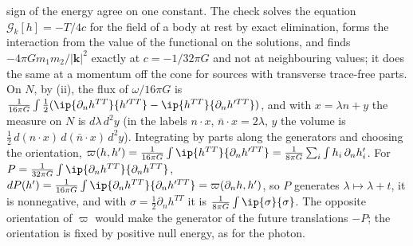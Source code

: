 sign of the energy agree on one constant. The check solves the equation $\mathcal{G}_{k}[h] = -T/4c$ for the field of a body at rest by exact elimination, forms the interaction from the value of the functional on the solutions, and finds $-4\pi G m_{1}m_{2}/|\mathbf{k}|^{2}$ exactly at $c = -1/32\pi G$ and not at neighbouring values; it does the same at a momentum off the cone for sources with transverse trace-free parts. On $N$, by (ii), the flux of $\omega/16\pi G$ is $\tfrac{1}{16\pi G}\int\tfrac12(\ip{\partial_{n}h^{TT}}{h'^{TT}} - \ip{h^{TT}}{\partial_{n}h'^{TT}})$, and with $x = \lambda n + y$ the measure on $N$ is $d\lambda\,d^{2}y$ (in the labels $n \cdot x$, $\bar n \cdot x = 2\lambda$, $y$ the volume is $\tfrac12\,d(n \cdot x)\,d(\bar n \cdot x)\,d^{2}y$). Integrating by parts along the generators and choosing the orientation, $\varpi(h, h') = \tfrac{1}{16\pi G}\int\ip{h^{TT}}{\partial_{n}h'^{TT}} = \tfrac{1}{8\pi G}\sum_{i}\int h_{i}\,\partial_{n}h_{i}'$. For $P = \tfrac{1}{32\pi G}\int\ip{\partial_{n}h^{TT}}{\partial_{n}h^{TT}}$, $dP(h') = \tfrac{1}{16\pi G}\int\ip{\partial_{n}h^{TT}}{\partial_{n}h'^{TT}} = \varpi(\partial_{n}h, h')$, so $P$ generates $\lambda \mapsto \lambda + t$, it is nonnegative, and with $\sigma = \tfrac12\partial_{n}h^{TT}$ it is $\tfrac{1}{8\pi G}\int\ip{\sigma}{\sigma}$. The opposite orientation of $\varpi$ would make the generator of the future translations $-P$; the orientation is fixed by positive null energy, as for the photon.

